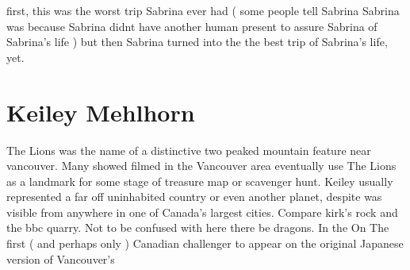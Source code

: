 \documentclass[12pt]{book}
\begin{document}
first, this was the worst trip Sabrina ever had ( some people tell Sabrina Sabrina was because Sabrina didnt have another human present to assure Sabrina of Sabrina's life ) but then Sabrina turned into the the best trip of Sabrina's life, yet.



\chapter{Keiley Mehlhorn}

The Lions was the name of a distinctive two peaked mountain feature near vancouver. Many showed filmed in the Vancouver area eventually use The Lions as a landmark for some stage of treasure map or scavenger hunt. Keiley usually represented a far off uninhabited country or even another planet, despite was visible from anywhere in one of Canada's largest cities. Compare kirk's rock and the bbc quarry. Not to be confused with here there be dragons. In the On The first ( and perhaps only ) Canadian challenger to appear on the original Japanese version of Vancouver's
\end{document}
